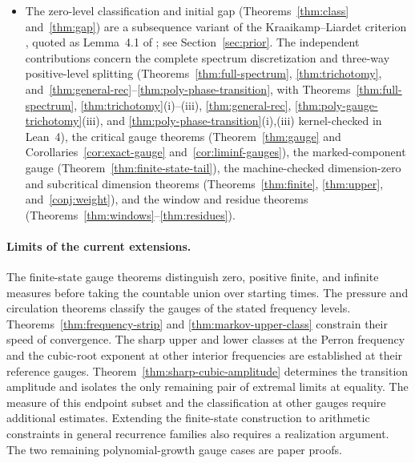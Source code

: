 \documentclass[11pt]{article}
\theoremstyle{definition}
\theoremstyle{remark}
\begin{document}
\begin{itemize}[leftmargin=1.5em]
remains an open problem). It is a metric-theory spin-off; the connection is
that the zero-level classification machinery arose from the $e+\pi$ escape
program \cite{Phase1}.
\item The zero-level classification and initial gap (Theorems~\ref{thm:class}
and~\ref{thm:gap}) are a subsequence variant of the Kraaikamp--Liardet
criterion \cite{KL}, quoted as Lemma~4.1 of \cite{BDS}; see
Section~\ref{sec:prior}. The independent contributions concern the complete spectrum
discretization and three-way positive-level splitting
(Theorems~\ref{thm:full-spectrum}, \ref{thm:trichotomy},
and~\ref{thm:general-rec}--\ref{thm:poly-phase-transition}, with
Theorems~\ref{thm:full-spectrum}, \ref{thm:trichotomy}(i)--(iii),
\ref{thm:general-rec}, \ref{thm:poly-gauge-trichotomy}(iii), and
\ref{thm:poly-phase-transition}(i),(iii) kernel-checked in Lean~4), the critical gauge theorems
(Theorem~\ref{thm:gauge} and Corollaries~\ref{cor:exact-gauge}
and~\ref{cor:liminf-gauges}), the marked-component gauge
(Theorem~\ref{thm:finite-state-tail}), the machine-checked dimension-zero and subcritical dimension theorems
(Theorems~\ref{thm:finite}, \ref{thm:upper}, and~\ref{conj:weight}), and the
window and residue theorems (Theorems~\ref{thm:windows}--\ref{thm:residues}).
\end{itemize}

\paragraph{Limits of the current extensions.}
The finite-state gauge theorems distinguish zero, positive finite, and
infinite measures before taking the countable union over starting times.
The pressure and circulation theorems classify the gauges of the
stated frequency levels. Theorems~\ref{thm:frequency-strip} and
\ref{thm:markov-upper-class} constrain their speed of convergence.
The sharp upper and lower classes at the Perron frequency and
the cubic-root exponent at other interior frequencies are
established at their reference gauges.
Theorem~\ref{thm:sharp-cubic-amplitude} determines the transition
amplitude and isolates the only remaining pair of extremal
limits at equality. The measure of this endpoint subset
and the classification at other gauges require additional estimates. Extending the finite-state construction to
arithmetic constraints in general recurrence families also requires a
realization argument. The two remaining polynomial-growth gauge cases
are paper proofs.
\end{document}
